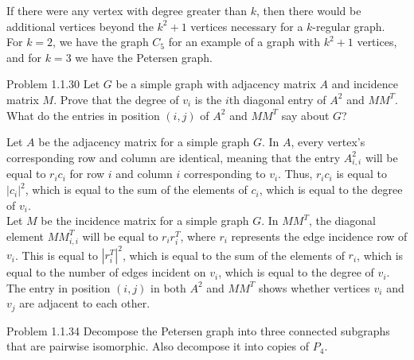 \documentclass[8pt]{extarticle}
\begin{document}
  \noindent If there were any vertex with degree greater than $k$, then there would be additional vertices beyond the $k^2 + 1$ vertices necessary for a $k$-regular graph.\\

  \noindent For  $k=2$, we have the graph $C_5$ for an example of a graph with $k^2 + 1$ vertices, and for $k=3$ we have the Petersen graph.
\begin{mathbox}{Problem 1.1.30}
    Let $G$ be a simple graph with adjacency matrix $A$ and incidence matrix $M$. Prove that the degree of $v_i$ is the $i$th diagonal entry of $A^2$ and $MM^T$. What do the entries in position $(i,j)$ of $A^2$ and $MM^T$ say about $G$?
  \end{mathbox}
  \noindent Let $A$ be the adjacency matrix for a simple graph $G$. In $A$, every vertex's corresponding row and column are identical, meaning that the entry $A^2_{i,i}$ will be equal to $r_ic_i$ for row $i$ and column $i$ corresponding to $v_i$. Thus, $r_ic_i$ is equal to $|c_i|^2$, which is equal to the sum of the elements of $c_i$, which is equal to the degree of $v_i$.\\

  \noindent Let $M$ be the incidence matrix for a simple graph $G$. In $MM^T$, the diagonal element $MM^T_{i,i}$ will be equal to $r_i r_i^T$, where $r_i$ represents the edge incidence row of $v_i$. This is equal to $\left|r_i^T\right|^2$, which is equal to the sum of the elements of $r_i$, which is equal to the number of edges incident on $v_i$, which is equal to the degree of $v_i$.\\

  \noindent The entry in position $(i,j)$ in both $A^2$ and $MM^T$ shows whether vertices $v_i$ and $v_j$ are adjacent to each other.
\begin{mathbox}{Problem 1.1.34}
    Decompose the Petersen graph into three connected subgraphs that are pairwise isomorphic. Also decompose it into copies of $P_4$.
  \end{mathbox}

\end{document}
